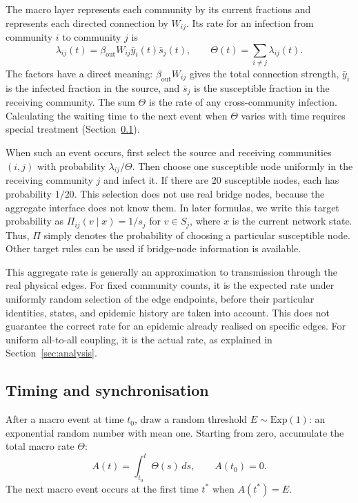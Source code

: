 \documentclass{ieeeaccess}
\newcommand{\ibar}{\bar{y}}
\newcommand{\sbar}{\bar{s}}
\newcommand{\Exp}{\mathrm{Exp}}
\begin{document}
The macro layer represents each community by its current fractions and represents each directed connection by $W_{ij}$. Its rate for an infection from community $i$ to community $j$ is
\begin{equation}
\label{eq:macro_rate}
\lambda_{ij}(t)=\beta_{\mathrm{out}}W_{ij}\ibar_i(t)\sbar_j(t),
\qquad
\Theta(t)=\sum_{i\neq j}\lambda_{ij}(t).
\end{equation}
The factors have a direct meaning: $\beta_{\mathrm{out}}W_{ij}$ gives the total connection strength, $\ibar_i$ is the infected fraction in the source, and $\sbar_j$ is the susceptible fraction in the receiving community. The sum $\Theta$ is the rate of any cross-community infection. Calculating the waiting time to the next event when $\Theta$ varies with time requires special treatment (Section~\ref{sec:timing}).

When such an event occurs, first select the source and receiving communities $(i,j)$ with probability $\lambda_{ij}/\Theta$. Then choose one susceptible node uniformly in the receiving community $j$ and infect it. If there are 20 susceptible nodes, each has probability $1/20$. This selection does not use real bridge nodes, because the aggregate interface does not know them. In later formulas, we write this target probability as $\Pi_{ij}(v\mid x)=1/s_j$ for $v\in S_j$, where $x$ is the current network state. Thus, $\Pi$ simply denotes the probability of choosing a particular susceptible node. Other target rules can be used if bridge-node information is available.

This aggregate rate is generally an approximation to transmission through the real physical edges. For fixed community counts, it is the expected rate under uniformly random selection of the edge endpoints, before their particular identities, states, and epidemic history are taken into account. This does not guarantee the correct rate for an epidemic already realised on specific edges. For uniform all-to-all coupling, it is the actual rate, as explained in Section~\ref{sec:analysis}.

\subsection{Timing and synchronisation}
\label{sec:timing}

After a macro event at time $t_0$, draw a random threshold $E\sim\Exp(1)$: an exponential random number with mean one. Starting from zero, accumulate the total macro rate $\Theta$:
\begin{equation}
\label{eq:hazard_integral}
A(t)=\int_{t_0}^{t}\Theta(s)\,ds,
\qquad A(t_0)=0.
\end{equation}
The next macro event occurs at the first time $t^\ast$ when $A(t^\ast)=E$.
\end{document}
